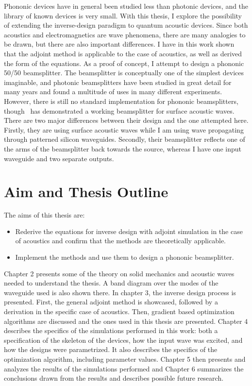 Phononic devices have in general been studied less than photonic
devices, and the library of known devices is very small.
With this thesis, I explore the possibility of extending the inverse-design paradigm to
quantum acoustic devices.
Since both acoustics and electromagnetics are wave phenomena, there are many
analogies to be drawn, but there are also important differences.
I have in this work shown that the adjoint method is applicable to the case of
acoustics, as well as derived the form of the equations.
As a proof of concept, I attempt to design a phononic 50/50 beamsplitter.
The beamsplitter is conceptually one of the simplest devices imaginable,
and photonic beamsplitters have been studied in great detail for many years
and found a multitude of uses in many different experiments.
However, there is still no standard implementation for phononic beamsplitters,
though~\cite{qiao2023developing} has demonstrated a working beamsplitter for
surface acoustic waves.
There are two major differences between their design and the one attempted here.
Firstly, they are using surface acoustic waves while I am using wave propagating
through patterned silicon waveguides.
Secondly, their beamsplitter reflects one of the arms of the beamsplitter back towards
the source, whereas I have one input waveguide and two separate outputs.

\section{Aim and Thesis Outline}

The aims of this thesis are:
\begin{itemize}
	\item Rederive the equations for inverse design with adjoint simulation in
		the case of acoustics and confirm that the methods are theoretically
		applicable.
	\item Implement the methods and use them to design a phononic beamsplitter.
\end{itemize}

Chapter 2 presents some of the theory on solid mechanics and acoustic waves needed to
understand the thesis.
A band diagram over the modes of the waveguide used is also shown there.
In chapter 3, the inverse design process is presented.
First, the general adjoint method is showcased,
followed by a derivation in the specific case of acoustics.
Then, gradient based optimization algorithms are discussed and the ones used in
this thesis are presented.
Chapter 4 describes the specifics of the simulations performed in this work:
both a specification of the skeleton of the devices, how the input wave was excited,
and how the designs were parametrized. It also describes the specifics of the
optimization algorithm, including parameter values.
Chapter 5 then presents and analyzes the results of the simulations performed
and Chapter 6 summarizes the conclusions drawn from the results and describes
possible future research.
